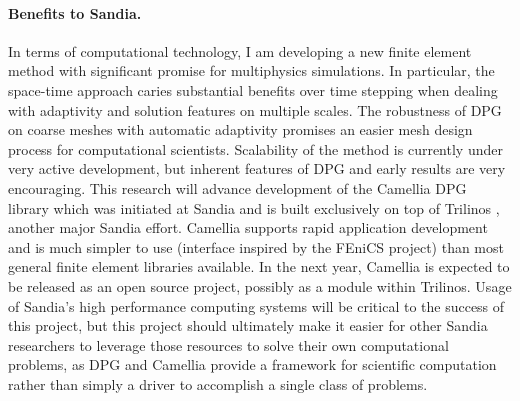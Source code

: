 \documentclass[letterpaper,12pt]{article}
\begin{document}
\paragraph{Benefits to Sandia.}
In terms of computational technology, I am developing a new finite element method with significant promise for multiphysics simulations.
In particular, the space-time approach caries substantial benefits over time stepping when dealing with adaptivity and solution features on multiple scales.
The robustness of DPG on coarse meshes with automatic adaptivity promises an easier mesh design process for computational scientists.
Scalability of the method is currently under very active development, but inherent features of DPG and early results are very encouraging.
This research will advance development of the Camellia \cite{CamelliaDPG} DPG library which was initiated at Sandia 
and is built exclusively on top of Trilinos \cite{Trilinos}, another major Sandia effort.
Camellia supports rapid application development and is much simpler to use (interface inspired by the FEniCS project) 
than most general finite element libraries available.
In the next year, Camellia is expected to be released as an open source project, possibly as a module within Trilinos.
Usage of Sandia's high performance computing systems will be critical to the success of this project, but this project should ultimately
make it easier for other Sandia researchers to leverage those resources to solve their own computational problems,
as DPG and Camellia provide a framework for scientific computation rather than simply a driver to accomplish a single class of problems.
\end{document}
